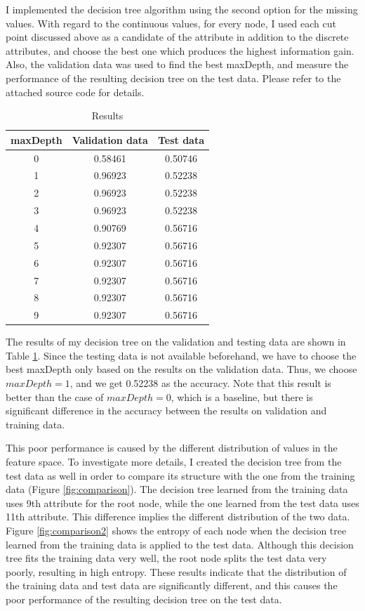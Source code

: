 \begin{enumerate}
I implemented the decision tree algorithm using the second option for the missing values. With regard to the continuous values, for every node, I used each cut point discussed above as a candidate of the attribute in addition to the discrete attributes, and choose the best one which produces the highest information gain. Also, the validation data was used to find the best maxDepth, and measure the performance of the resulting decision tree on the test data. Please refer to the attached source code for details.

\begin{table}[htb]
\begin{center}
\caption{Results}
\begin{tabular}{|c|c|c|} \hline
maxDepth & Validation data & Test data \\ \hline \hline
0 & 0.58461 & 0.50746 \\ \hline
1 & 0.96923 & 0.52238 \\ \hline
2 & 0.96923 & 0.52238 \\ \hline
3 & 0.96923 & 0.52238 \\ \hline
4 & 0.90769 & 0.56716 \\ \hline
5 & 0.92307 & 0.56716 \\ \hline
6 & 0.92307 & 0.56716 \\ \hline
7 & 0.92307 & 0.56716 \\ \hline
8 & 0.92307 & 0.56716 \\ \hline
9 & 0.92307 & 0.56716 \\ \hline
\end{tabular}
\label{tab:result}
\end{center}
\end{table}

The results of my decision tree on the validation and testing data are shown in Table \ref{tab:result}. Since the testing data is not available beforehand, we have to choose the best maxDepth only based on the results on the validation data. Thus, we choose $maxDepth=1$, and we get 0.52238 as the accuracy. Note that this result is better than the case of $maxDepth=0$, which is a baseline, but there is significant difference in the accuracy between the results on validation and training data.

This poor performance is caused by the different distribution of values in the feature space. To investigate more details, I created the decision tree from the test data as well in order to compare its structure with the one from the training data (Figure \ref{fig:comparison}). The decision tree learned from the training data uses 9th attribute for the root node, while the one learned from the test data uses 11th attribute. This difference implies the different distribution of the two data. Figure \ref{fig:comparison2} shows the entropy of each node when the decision tree learned from the training data is applied to the test data. Although this decision tree fits the training data very well, the root node splits the test data very poorly, resulting in high entropy. These results indicate that the distribution of the training data and test data are significantly different, and this causes the poor performance of the resulting decision tree on the test data.


\end{enumerate}
